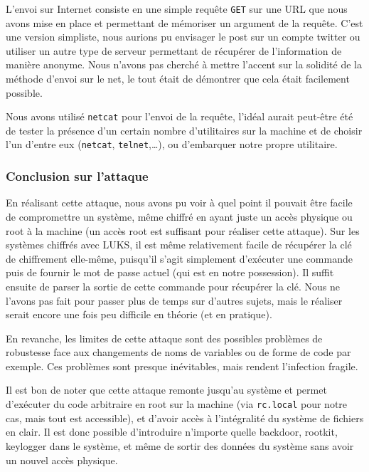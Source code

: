 \documentclass[12pt,a4paper]{article}
\begin{document}
L'envoi sur Internet consiste en une simple requête \texttt{GET} sur une URL que nous
avons mise en place et permettant de mémoriser un argument de la requête. C'est une
version simpliste, nous aurions pu envisager le post sur un compte twitter ou
utiliser un autre type de serveur permettant de récupérer de l'information de
manière anonyme. Nous n'avons pas cherché à mettre l'accent sur la solidité de
la méthode d'envoi sur le net, le tout était de démontrer que cela était
facilement possible.

Nous avons utilisé \texttt{netcat} pour l'envoi de la requête, l'idéal aurait peut-être
été de tester la présence d'un certain nombre d'utilitaires sur la machine et
de choisir l'un d'entre eux (\texttt{netcat}, \texttt{telnet},\dots), ou d'embarquer notre propre utilitaire.

\subsubsection*{Conclusion sur l'attaque}

En réalisant cette attaque, nous avons pu voir à quel point il pouvait être
facile de compromettre un système, même chiffré en ayant juste un accès physique
ou root à la machine (un accès root est suffisant pour réaliser cette attaque).
Sur les systèmes chiffrés avec LUKS, il est même relativement facile de récupérer
la clé de chiffrement elle-même, puisqu'il s'agit simplement d'exécuter une
commande puis de fournir le mot de passe actuel (qui est en notre possession). Il 
suffit ensuite de parser la sortie de cette commande pour récupérer la clé. Nous ne 
l'avons pas fait pour passer plus de temps sur d'autres sujets, mais le réaliser
serait encore une fois peu difficile en théorie (et en pratique).

En revanche, les limites de cette attaque sont des
possibles problèmes de robustesse face aux changements de noms de variables ou de forme
de code par exemple. Ces problèmes sont presque inévitables, mais rendent l'infection
fragile.

Il est bon de noter que cette attaque remonte jusqu'au système et permet
d'exécuter du code arbitraire en root sur la machine (via \texttt{rc.local} pour notre 
cas, mais tout est accessible), et d'avoir accès à l'intégralité du système de
fichiers en clair. Il est donc possible d'introduire n'importe quelle backdoor,
rootkit, keylogger dans le système, et même de sortir des données du système sans
avoir un nouvel accès physique.
\end{document}
